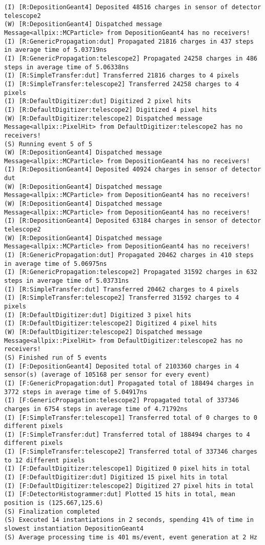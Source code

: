 \begin{lstlisting}[breaklines]
(I) [R:DepositionGeant4] Deposited 48516 charges in sensor of detector telescope2
(W) [R:DepositionGeant4] Dispatched message Message<allpix::MCParticle> from DepositionGeant4 has no receivers!
(I) [R:GenericPropagation:dut] Propagated 21816 charges in 437 steps in average time of 5.03719ns
(I) [R:GenericPropagation:telescope2] Propagated 24258 charges in 486 steps in average time of 5.06338ns
(I) [R:SimpleTransfer:dut] Transferred 21816 charges to 4 pixels
(I) [R:SimpleTransfer:telescope2] Transferred 24258 charges to 4 pixels
(I) [R:DefaultDigitizer:dut] Digitized 2 pixel hits
(I) [R:DefaultDigitizer:telescope2] Digitized 4 pixel hits
(W) [R:DefaultDigitizer:telescope2] Dispatched message Message<allpix::PixelHit> from DefaultDigitizer:telescope2 has no receivers!
(S) Running event 5 of 5
(W) [R:DepositionGeant4] Dispatched message Message<allpix::MCParticle> from DepositionGeant4 has no receivers!
(I) [R:DepositionGeant4] Deposited 40924 charges in sensor of detector dut
(W) [R:DepositionGeant4] Dispatched message Message<allpix::MCParticle> from DepositionGeant4 has no receivers!
(W) [R:DepositionGeant4] Dispatched message Message<allpix::MCParticle> from DepositionGeant4 has no receivers!
(I) [R:DepositionGeant4] Deposited 63184 charges in sensor of detector telescope2
(W) [R:DepositionGeant4] Dispatched message Message<allpix::MCParticle> from DepositionGeant4 has no receivers!
(I) [R:GenericPropagation:dut] Propagated 20462 charges in 410 steps in average time of 5.06975ns
(I) [R:GenericPropagation:telescope2] Propagated 31592 charges in 632 steps in average time of 5.03731ns
(I) [R:SimpleTransfer:dut] Transferred 20462 charges to 4 pixels
(I) [R:SimpleTransfer:telescope2] Transferred 31592 charges to 4 pixels
(I) [R:DefaultDigitizer:dut] Digitized 3 pixel hits
(I) [R:DefaultDigitizer:telescope2] Digitized 4 pixel hits
(W) [R:DefaultDigitizer:telescope2] Dispatched message Message<allpix::PixelHit> from DefaultDigitizer:telescope2 has no receivers!
(S) Finished run of 5 events
(I) [F:DepositionGeant4] Deposited total of 2103360 charges in 4 sensor(s) (average of 105168 per sensor for every event)
(I) [F:GenericPropagation:dut] Propagated total of 188494 charges in 3772 steps in average time of 5.04917ns
(I) [F:GenericPropagation:telescope2] Propagated total of 337346 charges in 6754 steps in average time of 4.71792ns
(I) [F:SimpleTransfer:telescope1] Transferred total of 0 charges to 0 different pixels
(I) [F:SimpleTransfer:dut] Transferred total of 188494 charges to 4 different pixels
(I) [F:SimpleTransfer:telescope2] Transferred total of 337346 charges to 12 different pixels
(I) [F:DefaultDigitizer:telescope1] Digitized 0 pixel hits in total
(I) [F:DefaultDigitizer:dut] Digitized 15 pixel hits in total
(I) [F:DefaultDigitizer:telescope2] Digitized 27 pixel hits in total
(I) [F:DetectorHistogrammer:dut] Plotted 15 hits in total, mean position is (125.667,125.6)
(S) Finalization completed
(S) Executed 14 instantiations in 2 seconds, spending 41% of time in slowest instantiation DepositionGeant4
(S) Average processing time is 401 ms/event, event generation at 2 Hz
\end{lstlisting}
